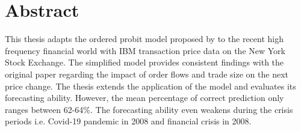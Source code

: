 \chapter*{Abstract}

This thesis adapts the ordered probit model proposed by \citet{hausman1992} to the recent high frequency financial world with IBM transaction price data on the New York Stock Exchange. The simplified model provides consistent findings with the original paper regarding the impact of order flows and trade size on the next price change. The thesis extends the application of the model and evaluates its forecasting ability. However, the mean percentage of correct prediction only ranges between 62-64\%. The forecasting ability even weakens during the crisis periods i.e. Covid-19 pandemic in 2008 and financial crisis in 2008.